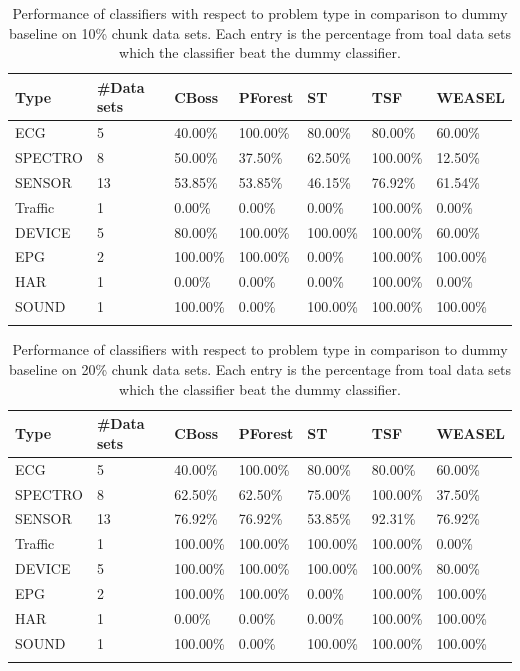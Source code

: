 \begin{table}[hp!]
	\setlength\extrarowheight{2pt} %
	\begin{tabularx}{\textwidth}{|X|X|X|X|X|X|X|}
	\hline
	\textbf{Type} & \textbf{\#Data sets} & \textbf{CBoss} & \textbf{PForest} & \textbf{ST} & \textbf{TSF} & \textbf{WEASEL} \\ \hline
		ECG & 5 & 40.00\% & 100.00\% & 80.00\% & 80.00\% & 60.00\% \\ \hline
		SPECTRO & 8 &50.00\% & 37.50\% & 62.50\% & 100.00\% & 12.50\% \\ \hline
		SENSOR & 13 & 53.85\% & 53.85\% & 46.15\% & 76.92\% & 61.54\% \\ \hline
		Traffic & 1 & 0.00\% & 0.00\% & 0.00\% & 100.00\% & 0.00\% \\ \hline
		DEVICE & 5 & 80.00\% & 100.00\% & 100.00\% & 100.00\% & 60.00\% \\ \hline
		EPG & 2 & 100.00\% & 100.00\% & 0.00\% & 100.00\% & 100.00\% \\ \hline
		HAR & 1 & 0.00\% & 0.00\% & 0.00\% & 100.00\% & 0.00\% \\ \hline
		SOUND & 1 & 100.00\% & 0.00\% & 100.00\% & 100.00\% & 100.00\% \\ \hline
  \caption{Performance of classifiers with respect to problem type in comparison to dummy baseline on 10\% chunk data sets. Each entry is the percentage from toal data sets which the classifier beat the dummy classifier.}
  \label{TableType10}
  \end{tabularx}
\end{table}

\begin{table}[hp!]
	\setlength\extrarowheight{2pt} %
	\begin{tabularx}{\textwidth}{|X|X|X|X|X|X|X|}
	\hline
	\textbf{Type} & \textbf{\#Data sets} & \textbf{CBoss} & \textbf{PForest} & \textbf{ST} & \textbf{TSF} & \textbf{WEASEL} \\ \hline
		ECG & 5 & 40.00\% & 100.00\% & 80.00\% & 80.00\% & 60.00\% \\ \hline
		SPECTRO & 8 &62.50\% & 62.50\% & 75.00\% & 100.00\% & 37.50\% \\ \hline
		SENSOR & 13 & 76.92\% & 76.92\% & 53.85\% & 92.31\% & 76.92\% \\ \hline
		Traffic & 1 & 100.00\% & 100.00\% & 100.00\% & 100.00\% & 0.00\% \\ \hline
		DEVICE & 5 & 100.00\% & 100.00\% & 100.00\% & 100.00\% & 80.00\% \\ \hline
		EPG & 2 & 100.00\% & 100.00\% & 0.00\% & 100.00\% & 100.00\% \\ \hline
		HAR & 1 & 0.00\% & 0.00\% & 0.00\% & 100.00\% & 100.00\% \\ \hline
		SOUND & 1 & 100.00\% & 0.00\% & 100.00\% & 100.00\% & 100.00\% \\ \hline
  \caption{Performance of classifiers with respect to problem type in comparison to dummy baseline on 20\% chunk data sets. Each entry is the percentage from toal data sets which the classifier beat the dummy classifier.}
  \label{TableType20}
  \end{tabularx}
\end{table}

